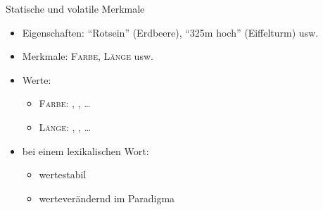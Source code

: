 \begin{frame}
  {Statische und volatile Merkmale}
  \pause
  \begin{itemize}[<+->]
    \item Eigenschaften: "`Rotsein"' (Erdbeere), "`325m hoch"' (Eiffelturm) usw.
    \item Merkmale: \alert{\textsc{Farbe}}, \alert{\textsc{Länge}} usw.
    \item Werte:
      \begin{itemize}[<+->]
        \item \alert{\textsc{Farbe}}: , , \ldots
        \item \alert{\textsc{Länge}}: \rot{\textit{3cm}}, , \ldots
      \end{itemize}
  \end{itemize}
  \pause
  \Halbzeile 
  \begin{exe}
    \ex
    \begin{xlist}
      \pause
      \pause
    \end{xlist}
  \end{exe}
  \Halbzeile
  \pause
  \begin{itemize}[<+->]
    \item bei einem lexikalischen Wort:
      \begin{itemize}
        \item {} wertestabil
        \item {} werteverändernd im Paradigma
      \end{itemize}
  \end{itemize}
\end{frame}

